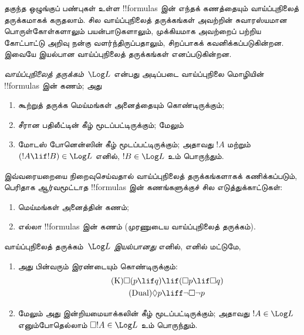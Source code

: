 \documentclass[../../../include/open-logic-section]{subfiles}
\begin{document}


தகுந்த ஒழுங்குப் பண்புகள் உள்ள !!{formula}s இன் எந்தக் கணத்தையும்
வாய்ப்புநிலைத் தருக்கமாகக் கருதலாம். சில வாய்ப்புநிலைத் தருக்கங்கள்
அவற்றின் சுவாரஸ்யமான பொருள்கோள்களாலும் பயன்பாடுகளாலும்,
முக்கியமாக அவற்றைப் பற்றிய கோட்பாட்டு அறிவு நன்கு வளர்ந்திருப்பதாலும்,
சிறப்பாகக் கவனிக்கப்படுகின்றன. இவையே இயல்பான வாய்ப்புநிலைத்
தருக்கங்கள் எனப்படுகின்றன.

\begin{defn}
\emph{வாய்ப்புநிலைத் தருக்கம்}~$\Log L$ என்பது அடிப்படை
வாய்ப்புநிலை மொழியின் !!{formula}s இன் கணம்; அது
\begin{enumerate}
\item கூற்றுத் தருக்க மெய்மங்கள் அனைத்தையும் கொண்டிருக்கும்;
\item சீரான பதிலீட்டின் கீழ் மூடப்பட்டிருக்கும்; மேலும்
\item மோடஸ் போனென்ஸின் கீழ் மூடப்பட்டிருக்கும்; அதாவது
  $!A$ மற்றும் $(!A \lif
  !B) \in \Log L$ எனில், $!B \in \Log L$ உம் பொருந்தும்.
\end{enumerate}
\end{defn}

\begin{ex}
இவ்வரையறையை நிறைவுசெய்வதால் வாய்ப்புநிலைத் தருக்கங்களாகக்
கணிக்கப்படும், பெரிதாக ஆர்வமூட்டாத !!{formula}s இன்
கணங்களுக்குச் சில எடுத்துக்காட்டுகள்:
\begin{enumerate}
\item மெய்மங்கள் அனைத்தின் கணம்;
\item எல்லா !!{formula}s இன் கணம் (முரணுடைய வாய்ப்புநிலைத் தருக்கம்).
\end{enumerate}
\end{ex}

\begin{defn}\label{defn:normal-modal-logic}
வாய்ப்புநிலைத் தருக்கம்~$\Log L$ \emph{இயல்பானது}
எனில், எனில் மட்டுமே,
\begin{enumerate}
\item அது பின்வரும் இரண்டையும் கொண்டிருக்கும்:
\begin{align}
\tag{K} \Box(p \lif q) & \lif (\Box p \lif \Box q) \\
\tag{Dual} \Diamond p & \liff \lnot \Box \lnot p
\end{align}
\item மேலும் அது இன்றியமையாக்கலின் கீழ் மூடப்பட்டிருக்கும்;
  அதாவது $!A \in
  \Log L$ எனும்போதெல்லாம் $ \Box !A \in \Log L$ உம் பொருந்தும்.
\end{enumerate}
\end{defn}
\end{document}

